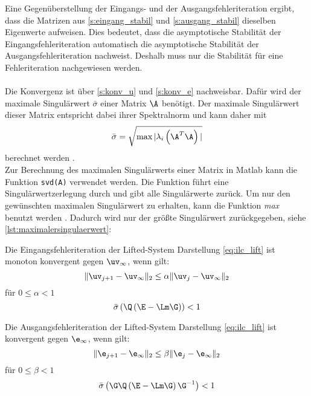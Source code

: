 Eine Gegenüberstellung der Eingangs- und der Ausgangsfehleriteration ergibt, dass die Matrizen aus \autoref{s:eingang_stabil} und \autoref{s:ausgang_stabil} dieselben Eigenwerte aufweisen. Dies bedeutet, dass die asymptotische Stabilität der Eingangsfehleriteration automatisch die asymptotische Stabilität der Ausgangsfehleriteration nachweist. Deshalb muss nur die Stabilität für eine Fehleriteration nachgewiesen werden. \\
\\
Die Konvergenz ist über \autoref{s:konv_u} und \autoref{s:konv_e} nachweisbar. Dafür wird der maximale Singulärwert $\bar{\sigma}$ einer Matrix $\A$ benötigt. Der maximale Singulärwert dieser Matrix entspricht dabei ihrer Spektralnorm und kann daher mit
\begin{equation}
	\label{eq:singulärwert}
	\bar{\sigma} = \sqrt{\text{max} \, |\lambda_i\left(\A^T\A\right)|}
\end{equation}
berechnet werden \cite{spektralnorm}. \\
Zur Berechnung des maximalen Singulärwerts einer Matrix in Matlab kann die Funktion \lstinline{svd(A)} verwendet werden. Die Funktion führt eine Singulärwertzerlegung durch und gibt alle Singulärwerte zurück. Um nur den gewünschten maximalen Singulärwert zu erhalten, kann die Funktion \textit{max} benutzt werden \cite{MATLAB}. Dadurch wird nur der größte Singulärwert zurückgegeben, siehe \autoref{lst:maximalersingulaerwert}: 

\begin{satz}
	\label{s:konv_u}
	Die Eingangs\-fehleriteration der Lifted-System Darstellung \ref{eq:ilc_lift} ist monoton konvergent gegen $\uv_{\infty}$, wenn gilt:
	\begin{equation*}
		\label{eq:konv_u_1}
		\|\uv_{j+1} - \uv_{\infty}\|_2 \leq \alpha \|\uv_{j} - \uv_{\infty}\|_2
	\end{equation*}
	für $ 0 \leq \alpha < 1$ 
	\begin{equation}
		\label{eq:konv_u}
		\bar{\sigma}\left(\Q\left(\E-\Lm\G\right)\right) < 1
	\end{equation}
\end{satz}
\begin{satz}
	\label{s:konv_e}
	Die Ausgangs\-fehler\-itera\-tion der Lifted-System Darstellung \ref{eq:ilc_lift} ist konvergent gegen $\e_{\infty}$, wenn gilt:
	\begin{equation*}
		\label{eq:konv_e_1}
		\|\e_{j+1} - \e_{\infty}\|_2 \leq \beta \|\e_{j} - \e_{\infty}\|_2
	\end{equation*}
	für $ 0 \leq \beta < 1$ 
	\begin{equation}
		\label{eq:konv_e}
		\bar{\sigma}\left(\G\Q\left(\E-\Lm\G\right)\G^{-1}\right) < 1
	\end{equation}
\end{satz}

